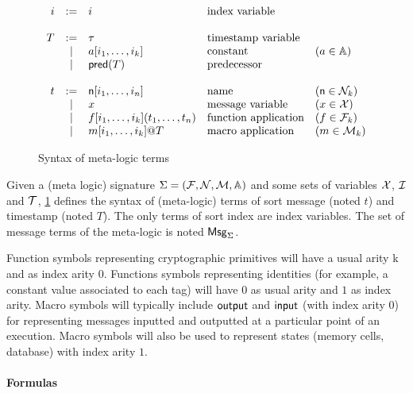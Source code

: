 \begin{figure}[h]
\[
  \begin{array}{rclll}
    i &:=& i & \text{index variable} & \\
    \\
    T &:=& \tau & \text{timestamp variable} & \\
      &\mid& a[i_1,\ldots,i_k] & \text{constant} & (a\in\mathbb{A}) \\
      &\mid & \textsf{pred}(T) & \text{predecessor} & \\
    \\
    t & := & \mathsf{n}[i_1,\ldots,i_n] &\text{name} & (\mathsf{n}\in\mathcal{N}_k) \\
      & \mid & x  & \text{message variable} & (x\in\mathcal{X}) \\
      & \mid & f[i_1,\ldots,i_k](t_1,\dots,t_n) &\text{function application} & (f\in\mathcal{F}_k)\\
      & \mid & m[i_1,\ldots,i_k]@T &\text{macro application} & (m\in\mathcal{M}_k)\\
  \end{array}
\]
\caption{Syntax of meta-logic terms}\label{fig:terms}
\end{figure}

\begin{definition}
  Given a (meta logic) signature $\Sigma = (\mathcal{F},\mathcal{N},\mathcal{M},\mathbb{A})$
  and some sets of variables
  $\mathcal{X}$, $\mathcal{I}$ and $\mathcal{T}$,
  \cref{fig:terms} defines the syntax of (meta-logic) terms
  of sort message (noted $t$) and timestamp (noted $T$).
  The only terms of sort index are index variables.
  The set of message terms of the meta-logic is noted $\mathsf{Msg}_\Sigma$.
\end{definition}

\begin{remark}
  Function symbols representing cryptographic primitives will have a usual
  arity k and as index arity $0$.
  Functions symbols representing identities (for example, a constant value
  associated to each tag) will have $0$ as usual arity and $1$ as index arity.
  Macro symbols will typically include $\textsf{output}$ and $\textsf{input}$
  (with index arity $0$) for representing messages inputted and
  outputted at a particular point of an execution.
  Macro symbols will also be used to represent states (memory cells, database)
  with index arity $1$.
\end{remark}


\paragraph{Formulas}

